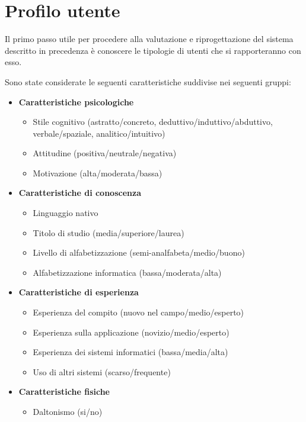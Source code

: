 \section{Profilo utente}

Il primo passo utile per procedere alla valutazione e riprogettazione del sistema descritto in precedenza è conoscere le tipologie di utenti che si rapporteranno con esso.

Sono state considerate le seguenti caratteristiche suddivise nei seguenti gruppi:

\begin{itemize}
	\item \textbf{Caratteristiche psicologiche}
	      \begin{itemize}
		      \item Stile cognitivo (astratto/concreto, deduttivo/induttivo/abduttivo, verbale/spaziale, analitico/intuitivo)
		      \item Attitudine (positiva/neutrale/negativa)
		      \item Motivazione (alta/moderata/bassa)
	      \end{itemize}
	\item \textbf{Caratteristiche di conoscenza}
	      \begin{itemize}
		      \item Linguaggio nativo
		      \item Titolo di studio (media/superiore/laurea)
		      \item Livello di alfabetizzazione (semi-analfabeta/medio/buono)
		      \item Alfabetizzazione informatica (bassa/moderata/alta)
	      \end{itemize}
	\item \textbf{Caratteristiche di esperienza}
	      \begin{itemize}
		      \item Esperienza del compito (nuovo nel campo/medio/esperto)
		      \item Esperienza sulla applicazione (novizio/medio/esperto)
		      \item Esperienza dei sistemi informatici (bassa/media/alta)
		      \item Uso di altri sistemi (scarso/frequente)
	      \end{itemize}
	\item \textbf{Caratteristiche fisiche}
	      \begin{itemize}
		      \item Daltonismo (si/no)

\end{itemize}
\end{itemize}
